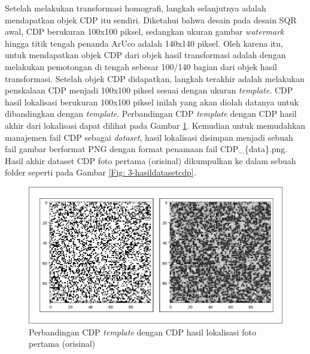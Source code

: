 Setelah melakukan transformasi homografi, langkah selanjutnya adalah mendapatkan objek CDP itu sendiri. Diketahui bahwa desain pada desain SQR awal, CDP
berukuran 100x100 piksel, sedangkan ukuran gambar \emph{watermark} hingga titik tengah penanda ArUco adalah 140x140 piksel. Oleh karena itu, untuk mendapatkan
objek CDP dari objek hasil transformasi adalah dengan melakukan pemotongan di tengah sebesar 100/140 bagian dari objek hasil transformasi. Setelah objek CDP
didapatkan, langkah terakhir adalah melakukan penskalaan CDP menjadi 100x100 piksel sesuai dengan ukuran \emph{template}. CDP hasil lokalisasi berukuran
100x100 piksel inilah yang akan diolah datanya untuk dibandingkan dengan \emph{template}. Perbandingan CDP \emph{template} dengan CDP hasil akhir dari
lokalisasi dapat dilihat pada Gambar \ref{Fig: 3-templatevslokalisasi}. Kemudian untuk memudahkan manajemen fail CDP sebagai \emph{dataset}, hasil lokalisasi
disimpan menjadi sebuah fail gambar berformat PNG dengan format penamaan fail CDP\_\{data\}.png. Hasil akhir dataset CDP foto pertama (orisinal) dikumpulkan ke
dalam sebuah folder seperti pada Gambar \ref{Fig: 3-hasildatasetcdp}.

\begin{figure}[h]
	\centering
	\includegraphics[width=13cm]{contents/chapter-3/3-templatevslokalisasi.png}
	\caption{Perbandingan CDP \emph{template} dengan CDP hasil lokalisasi foto pertama (orisinal)}
	\label{Fig: 3-templatevslokalisasi}
\end{figure}

